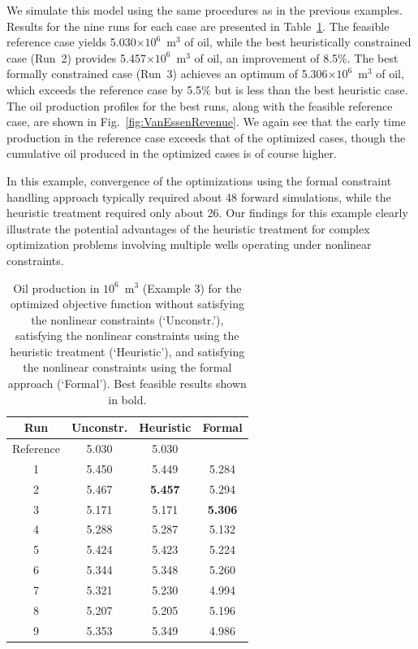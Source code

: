 We simulate this model using the same procedures as in the previous examples.
Results for the nine runs for each case are presented in
Table~\ref{table:vanessen}. The feasible reference case yields 5.030$\times 10^6$~m$^3$ of
oil, while the best heuristically constrained case (Run~2) provides 5.457$\times 10^6$~m$^3$
of oil, an improvement of 8.5\%. The best formally constrained case (Run~3)
achieves an optimum of 5.306$\times 10^6$~m$^3$ of oil, which exceeds the reference case by
5.5\% but is less than the best heuristic case. The oil production profiles
for the best runs, along with the feasible reference case, are shown in
Fig.~\ref{fig:VanEssenRevenue}. We again see that the early time production in
the reference case exceeds that of the optimized cases, though the cumulative
oil produced in the optimized cases is of course higher. 

In this example, convergence of the optimizations using the formal constraint handling approach 
typically required about 48 forward simulations, while the heuristic treatment required only about 26. Our findings for this example clearly illustrate the potential advantages of the heuristic treatment for complex optimization problems involving multiple wells operating under nonlinear constraints.



\begin{table}
\centering
\caption{Oil production in $10^6$~m$^3$ (Example 3) for the optimized objective function
         without satisfying the nonlinear constraints (`Unconstr.'), satisfying the nonlinear constraints
         using the heuristic treatment (`Heuristic'), and satisfying the nonlinear constraints
         using the formal approach (`Formal'). Best feasible results shown in bold.}
\begin{tabular}{|c|c|c|c|}
\hline
 Run              & Unconstr. & Heuristic & Formal     \\
\hline
Reference         & 5.030 &  5.030    &          \\
1 & 5.450 &  5.449   &  5.284   \\
2 & 5.467 &\bf{5.457} &  5.294   \\
3 & 5.171 &  5.171   &\bf{5.306}\\
4 & 5.288 &  5.287   &  5.132   \\
5 & 5.424 &  5.423   &  5.224   \\
6 & 5.344 &  5.348   &  5.260   \\
7 & 5.321 &  5.230   &  4.994   \\
8 & 5.207 &  5.205   &  5.196   \\
9 & 5.353 &  5.349   &  4.986   \\
\hline
\end{tabular}
  \label{table:vanessen}
\end{table}


